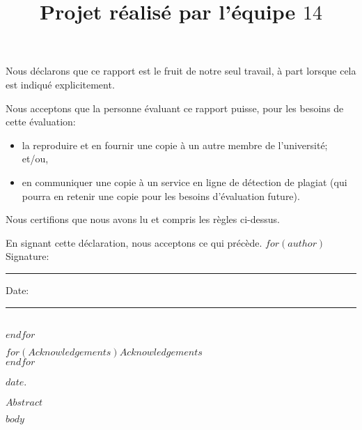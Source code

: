 \documentclass[mstat,12pt]{unswthesis}
\title{Projet réalisé par l'équipe $14$}
\author{\Authornameonly}
\begin{document}
\beforepreface




\vskip 2pc \noindent Nous déclarons que ce rapport est le fruit de notre seul travail, à part lorsque cela est indiqué  explicitement. 

\vskip 2pc  \noindent Nous acceptons que la personne évaluant ce rapport puisse, pour les besoins de cette évaluation:
\begin{itemize}
\item la reproduire et en fournir une copie à un autre membre de l'université; et/ou,
\item en communiquer une copie à un service en ligne de détection de plagiat (qui pourra en retenir une copie pour les besoins d'évaluation future).
\end{itemize}

\vskip 2pc \noindent Nous certifions que nous avons lu et compris les règles ci-dessus.\vspace{24pt}

\vskip 2pc \noindent En signant cette déclaration, nous acceptons ce qui précède.
\vskip 2pc \noindent
$for(author)$
Signature: \rule{7cm}{0.25pt} \hfill Date: \rule{4cm}{0.25pt} \\[1cm]
$endfor$
\vskip 1pc





{\bigskip}$for(Acknowledgements)$$Acknowledgements$\\[1cm] $endfor$

{\bigskip\bigskip\bigskip\noindent} $date$.




$Abstract$



\afterpreface





%
%






$body$
\end{document}
